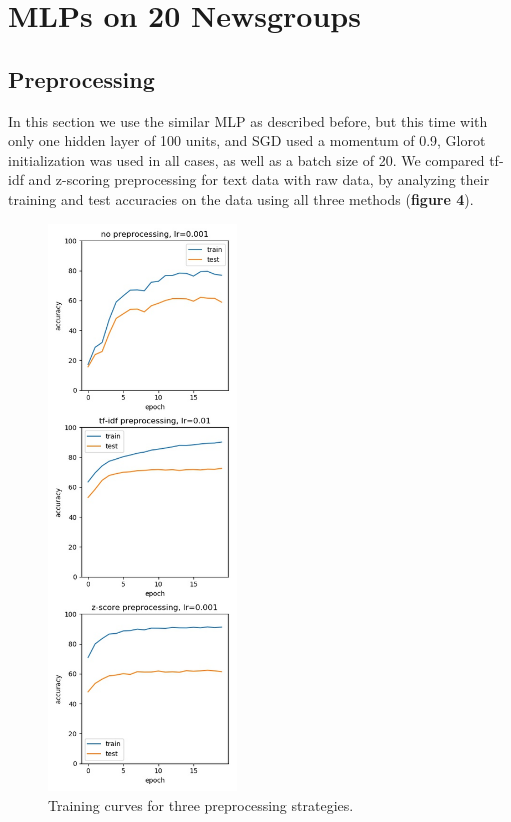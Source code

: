\documentclass{amsart}
\theoremstyle{definition}
\theoremstyle{remark}
\numberwithin{equation}{section}
\begin{document}
\section{MLPs on 20 Newsgroups}

\subsection{Preprocessing}

In this section we use the similar MLP as described before, but this time with
only one hidden layer of 100 units, and SGD used a momentum of 0.9, Glorot
initialization was used in all cases, as well as a batch size of 20. We compared
tf-idf and z-scoring preprocessing for text data with raw data, by analyzing
their training and test accuracies on the data using all three methods
(\textbf{figure 4}).  \\

\begin{figure}[h]
\includegraphics[width=50mm]{04_preproc}
\caption{Training curves for three preprocessing strategies.}
\label{Figure 4}
\end{figure}
\end{document}
